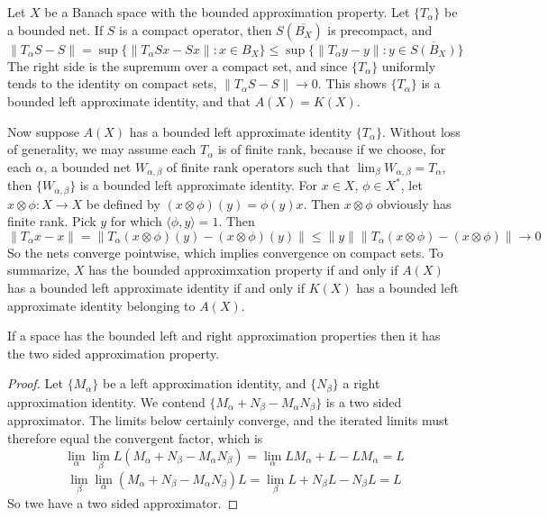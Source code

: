 \begin{example}
    Let $X$ be a Banach space with the bounded approximation property. Let $\{ T_\alpha \}$ be a bounded net. If $S$ is a compact operator, then $S(\overline{B_X})$ is precompact, and
    \[ \| T_\alpha S - S \| = \sup \{ \| T_\alpha Sx - Sx \| : x \in B_X \} \leq \sup \{ \| T_\alpha y - y \| : y \in \overline{S(B_X)} \} \]
    The right side is the supremum over a compact set, and since $\{ T_\alpha \}$ uniformly tends to the identity on compact sets, $\| T_\alpha S - S \| \to 0$. This shows $\{ T_\alpha \}$ is a bounded left approximate identity, and that $A(X) = K(X)$.

    Now suppose $A(X)$ has a bounded left approximate identity $\{ T_\alpha \}$. Without loss of generality, we may assume each $T_\alpha$ is of finite rank, because if we choose, for each $\alpha$, a bounded net $W_{\alpha, \beta}$ of finite rank operators such that $\lim_\beta W_{\alpha, \beta} = T_\alpha$, then $\{ W_{\alpha, \beta} \}$ is a bounded left approximate identity. For $x \in X$, $\phi \in X^*$, let $x \otimes \phi : X \to X$ be defined by $(x \otimes \phi)(y) = \phi(y) x$. Then $x \otimes \phi$ obviously has finite rank. Pick $y$ for which $\langle \phi, y \rangle = 1$. Then
    \[ \| T_\alpha x - x \| = \| T_\alpha (x \otimes \phi)(y) - (x \otimes \phi)(y) \| \leq \| y \| \| T_\alpha (x \otimes \phi) - (x \otimes \phi) \| \to 0 \]
    So the nets converge pointwise, which implies convergence on compact sets. To summarize, $X$ has the bounded approximxation property if and only if $A(X)$ has a bounded left approximate identity if and only if $K(X)$ has a bounded left approximate identity belonging to $A(X)$.
\end{example}

\begin{lemma}
    If a space has the bounded left and right approximation properties then it has the two sided approximation property.
\end{lemma}
\begin{proof}
    Let $\{ M_\alpha \}$ be a left approximation identity, and $\{ N_\beta \}$ a right approximation identity. We contend $\{ M_\alpha + N_\beta - M_\alpha N_\beta \}$ is a two sided approximator. The limits below certainly converge, and the iterated limits must therefore equal the convergent factor, which is
    \[ \lim_\alpha \lim_\beta L(M_\alpha + N_\beta - M_\alpha N_\beta) = \lim_\alpha LM_\alpha + L - LM_\alpha = L \]
    \[ \lim_\beta \lim_\alpha (M_\alpha + N_\beta - M_\alpha N_\beta)L = \lim_\beta L + N_\beta L - N_\beta L = L \]
    So twe have a two sided approximator.
\end{proof}

